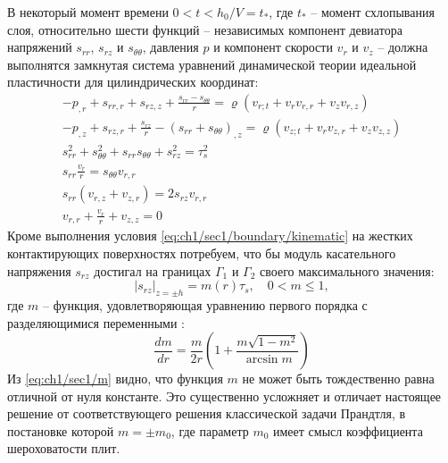 В некоторый момент времени $0 < t < h_{0}/V = t_*$, где $t_*$ -- момент схлопывания слоя, относительно шести функций -- независимых компонент девиатора напряжений $s_{rr}$, $s_{rz}$ и $s_{\theta\theta}$, давления $p$ и компонент скорости $v_{r}$ и $v_{z}$ -- должна выполнятся замкнутая система уравнений динамической теории идеальной пластичности для цилиндрических координат:
\begin{subequations}
  \label{eqs:ch1/sec1/general}
  \begin{gather}
    \label{eqs:ch1/sec1/general/motion:1}
    -p_{,r}+s_{rr,r}+s_{rz,z}+\frac{s_{rr}-s_{\theta\theta}}{r} = \varrho \left(v_{r;t}+v_{r} v_{r,r} + v_{z} v_{r,z} \right)
    \\
    \label{eqs:ch1/sec1/general/motion:2}
    -p_{,z}+s_{rz,r}+\frac{s_{rz}}{r}-(s_{rr}+s_{\theta\theta})_{,z} = \varrho \left(v_{z;t}+v_{r} v_{z,r} + v_{z} v_{z,z} \right)
    \\
    \label{eqs:ch1/sec1/general/plasticity}
    s^2_{rr}+s^2_{\theta\theta}+s_{rr} s_{\theta\theta} + s^2_{rz}=\tau^2_{s}
    \\
    \label{eqs:ch1/sec1/general/coax:1}
    s_{rr} \frac{v_{r}}{r} = s_{\theta\theta} v_{r,r}
    \\
    \label{eqs:ch1/sec1/general/coax:2}
    s_{rr} (v_{r,z}+v_{z,r}) = 2 s_{rz} v_{r,r}
    \\
    \label{eqs:ch1/sec1/general/uncompress}
    v_{r,r}+\frac{v_{r}}{r}+v_{z,z} = 0
  \end{gather}
\end{subequations}
Кроме выполнения условия \cref{eq:ch1/sec1/boundary/kinematic} на жестких контактирующих поверхностях потребуем, что бы модуль касательного напряжения $s_{rz}$ достигал на границах $\Gamma_{1}$ и $\Gamma_{2}$ своего максимального значения:
\begin{equation}
  \label{eq:ch1/sec1/boundary/force}
  \lvert s_{rz}\lvert_{z=\pm h} = m(r) \tau_{s}, \quad 0 < m \le 1,
\end{equation}
где $m$ -- функция, удовлетворяющая уравнению первого порядка с разделяющимися переменными \autocite{Georgievsky:2008}:
\begin{equation}
  \label{eq:ch1/sec1/m}
  \frac{dm}{dr}=\frac{m}{2r}\left(1+\frac{m\sqrt{1-m^2}}{\arcsin m}\right)
\end{equation}
Из \cref{eq:ch1/sec1/m} видно, что функция $m$ не может быть тождественно равна отличной от нуля константе. Это существенно усложняет и отличает настоящее решение от соответствующего решения классической задачи Прандтля, в постановке которой $m = \pm m_0$, где параметр $m_0$  имеет смысл коэффициента шероховатости плит.

